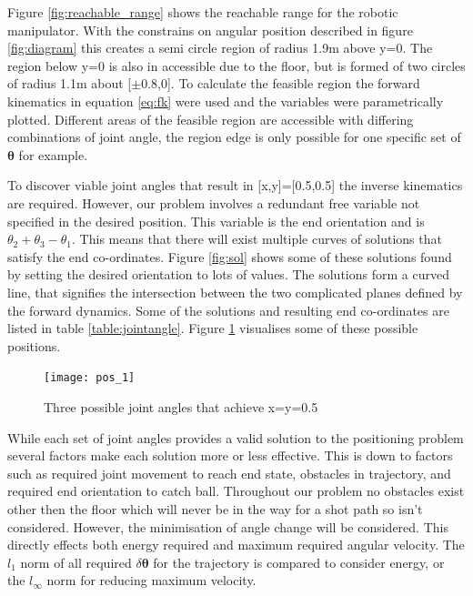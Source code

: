 \documentclass[twoside,twocolumn]{article}
\begin{document}
Figure \ref{fig:reachable_range} shows the reachable range for the robotic manipulator. With the constrains on angular position described in figure \ref{fig:diagram} this creates a semi circle region of radius 1.9m above y=0. The region below y=0 is also in accessible due to the floor, but is formed of two circles of radius 1.1m about [$\pm$0.8,0]. To calculate the feasible region the forward kinematics in equation \ref{eq:fk} were used and the variables were parametrically plotted. Different areas of the feasible region are accessible with differing combinations of joint angle, the region edge is only possible for one specific set of $\boldsymbol{\theta}$ for example.



To discover viable joint angles that result in [x,y]=[0.5,0.5] the inverse kinematics are required. However, our problem involves a redundant free variable not specified in the desired position. This variable is the end orientation and is $\theta_2+\theta_3-\theta_1$. This means that there will exist multiple curves of solutions that satisfy the end co-ordinates. Figure \ref{fig:sol} shows some of these solutions found by setting the desired orientation to lots of values. The solutions form a curved line, that signifies the intersection between the two complicated planes defined by the forward dynamics. Some of the solutions and resulting end co-ordinates are listed in table \ref{table:jointangle}. Figure \ref{fig:pos-1} visualises some of these possible positions.

\begin{figure}[h]
  \centering
    \texttt{[image: pos\_1]}
  \caption{Three possible joint angles that achieve x=y=0.5}
  \label{fig:pos-1}
\end{figure}


While each set of joint angles provides a valid solution to the positioning problem several factors make each solution more or less effective. This is down to factors such as required joint movement to reach end state, obstacles in trajectory, and required end orientation to catch ball. Throughout our problem no obstacles exist other then the floor which will never be in the way for a shot path so isn't considered. However, the minimisation of angle change will be considered. This directly effects both energy required and maximum required angular velocity. The $l_1$ norm of all required $\delta \boldsymbol{\theta} $  for the trajectory is compared to consider energy, or the $l_{\infty}$ norm for reducing maximum velocity.
\end{document}
